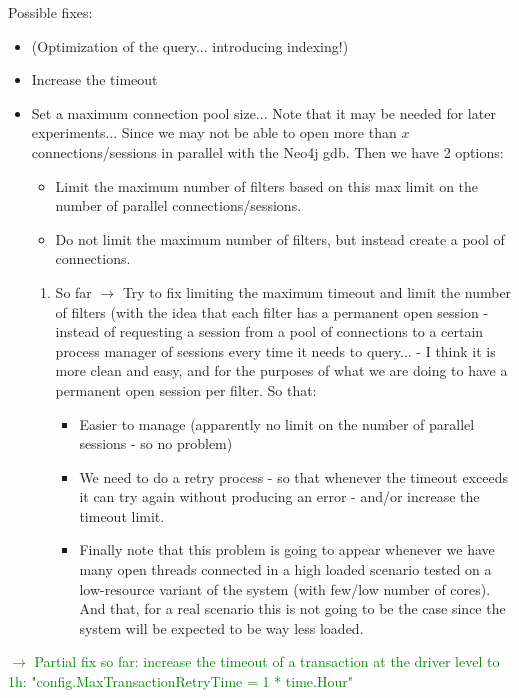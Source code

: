 Possible fixes:
\begin{itemize}
    \item (Optimization of the query... introducing indexing!)
    \item Increase the timeout
    \item Set a maximum connection pool size... Note that it may be needed for later experiments...
    Since we may not be able to open more than $x$ connections/sessions in parallel with the Neo4j gdb. Then we have 2 options:
    \begin{itemize}
        \item Limit the maximum number of filters based on this max limit on the number of parallel connections/sessions.
        \item Do not limit the maximum number of filters, but instead create a pool of connections.
    \end{itemize}
    \begin{enumerate}
        \item So far $\rightarrow$ Try to fix limiting the maximum timeout and limit the number of filters (with the idea that each filter has a permanent open session - instead of requesting a session from a pool of connections to a certain process manager of sessions every time it needs to query... - I think it is more clean and easy, and for the purposes of what we are doing to have a permanent open session per filter. So that:
        \begin{itemize}
            \item Easier to manage (apparently no limit on the number of parallel sessions - so no problem)
            \item We need to do a retry process - so that whenever the timeout exceeds it can try again without producing an error - and/or increase the timeout limit.
            \item Finally note that this problem is going to appear whenever we have many open threads connected in a high loaded scenario tested on a low-resource variant of the system (with few/low number of cores). And that, for a real scenario this is not going to be the case since the system will be expected to be way less loaded.
        \end{itemize}
    \end{enumerate}
\end{itemize}

\textcolor{green}{$\rightarrow$ Partial fix so far: increase the timeout of a transaction at the driver level to 1h: "config.MaxTransactionRetryTime = 1 * time.Hour"\\}

